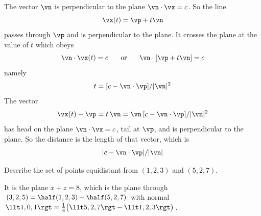 \begin{solution}
The vector $\vn$ is perpendicular to the plane
$\vn\cdot\vx= c$. So the line
\begin{equation*}
\vx(t)=\vp+t\vn
\end{equation*}
passes through $\vp$ and is perpendicular to the plane. 
%
It crosses the plane at the value of $t$ which obeys
\begin{equation*}
\vn\cdot\vx(t)= c
\hskip .25 in\text{or}\hskip .25 in
\vn\cdot[\vp+t\vn]= c
\end{equation*}
namely
\begin{equation*}
t=[c-\vn\cdot\vp]/|\vn|^2
\end{equation*}
The vector
\begin{equation*}
\vx(t)-\vp=t\,\vn=\vn\,[c-\vn\cdot\vp]/|\vn|^2
\end{equation*}
has head on the plane $\vn\cdot\vx= c$, tail at $\vp$, and
is perpendicular to the plane. So the distance is the length of that
vector, which is
\begin{equation*}
|c-\vn\cdot\vp|/|\vn|
\end{equation*}
\end{solution}

\begin{question}
Describe the set of points equidistant from $(1,2,3)$ and
$(5,2,7)$.
\end{question}


\begin{answer}
It is the plane $x+z=8$, which is 
the plane through $(3,2,5)=\half(1,2,3)+\half(5,2,7)$ with normal 
$\llt 1,0,1\rgt=\frac{1}{4}\big(\llt 5,2,7\rgt-\llt 1,2,3\rgt \big)$.
\end{answer}

